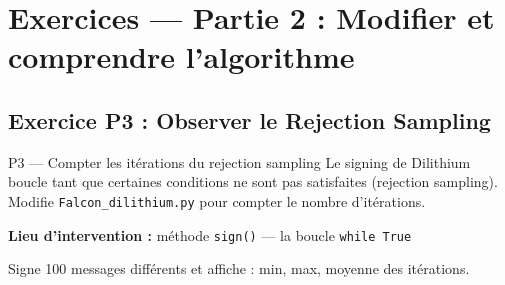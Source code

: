 \documentclass[12pt, a4paper]{article}
\begin{document}
\newpage
\section{Exercices --- Partie 2 : Modifier et comprendre l'algorithme}

\subsection{Exercice P3 : Observer le Rejection Sampling}

\begin{exercice}{P3 --- Compter les itérations du rejection sampling}
Le signing de Dilithium boucle tant que certaines conditions ne sont pas satisfaites (rejection sampling).
Modifie \texttt{Falcon\_dilithium.py} pour compter le nombre d'itérations.

\textbf{Lieu d'intervention :} méthode \texttt{sign()} --- la boucle \texttt{while True}

Signe 100 messages différents et affiche : min, max, moyenne des itérations.
\end{exercice}
\end{document}
